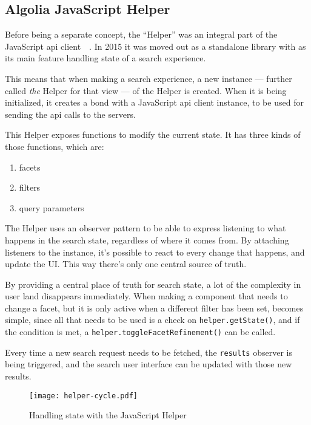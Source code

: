 
\subsection{Algolia JavaScript Helper} %
\label{sub:algolia_js_helper}

Before being a separate concept, the ``Helper'' was an integral part of the JavaScript \acrshort{api} client~\cite{algolia-blog-js-client}~. In 2015 it was moved out as a standalone \gls{library} with as its main feature handling state of a search experience.

This means that when making a search experience, a new instance --- further called \emph{the} Helper for that view --- of the Helper is created. When it is being initialized, it creates a bond with a JavaScript \acrshort{api} client instance, to be used for sending the \acrshort{api} calls to the servers.

This Helper exposes functions to modify the current state. It has three kinds of those functions, which are:

\begin{enumerate}
  \item facets
  \item filters
  \item query parameters
\end{enumerate}

The Helper uses an observer pattern to be able to express listening to what happens in the search state, regardless of where it comes from. By attaching listeners to the instance, it's possible to react to every change that happens, and update the UI. This way there's only one central source of truth.

By providing a central place of truth for search state, a lot of the complexity in user land disappears immediately. When making a component that needs to change a facet, but it is only active when a different filter has been set, becomes simple, since all that needs to be used is a check on {\tt helper.getState()}, and if the condition is met, a {\tt helper.toggleFacetRefinement()} can be called.

Every time a new search request needs to be fetched, the {\tt results} observer is being triggered, and the search user interface can be updated with those new results.

\begin{figure}[H]
  \centering
  \texttt{[image: helper-cycle.pdf]}
  \caption{Handling state with the JavaScript Helper\cite{js-helper-concepts}}
  \label{figure:js-helper-state}
\end{figure}

